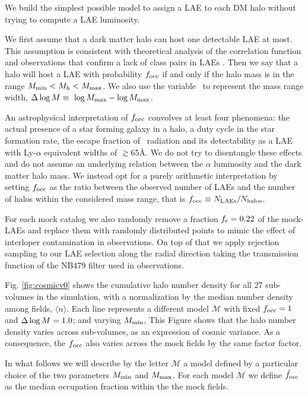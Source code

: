\documentclass{emulateapj}
\newcommand{\ly}{{\ifmmode{{\rm Ly}\alpha}\else{Ly$\alpha$}\fi}}
\newcommand{\mmin}{{\ifmmode{{M_{\rm min}}}\else{${M_{\rm min}}$}\fi}}
\newcommand{\mmax}{{\ifmmode{{M_{\rm max}}}\else{${M_{\rm max}}$}\fi}}
\newcommand{\dlm}{{\ifmmode{{\Delta \log M}}\else{$\Delta \log M$}\fi}}
\newcommand{\focc}{{\ifmmode{{f_{\rm occ}}}\else{${f_{\rm occ}}$}\fi}}
\begin{document}
We build the simplest possible model to assign a LAE to each DM halo
without trying to compute a LAE luminosity.
  
We first assume that a dark matter halo can host one detectable LAE at
most.   
This assumption is consistent with theoretical analysis of the
correlation function \citep{Jose2013b} and observations that confirm a
lack of  class pairs in LAEs \citep{Bond2009}.  
Then we say that a halo will host a LAE with probability $\focc$
if and only if the halo mass is in the range $\mmin < M_{\mathrm
  h} < \mmax$. 
We also use the variable \dlm\ to represent the mass range width,
$\dlm\equiv\ \log \mmax - \log \mmax$.  


An astrophysical interpretation of $f_{\rm occ}$ convolves at least
four phenomena: the actual presence of a star forming galaxy in a
halo, a duty cycle in the star formation rate, the escape fraction of
\ly\ radiation and its detectability as a LAE with Ly-$\alpha$ equivalent widths of $\gtrsim$65\AA.   
We do not try to disentangle these effects and do not assume an underlying relation between the
$\alpha$ luminosity and the dark matter halo mass.
We instead opt for a purely arithmetic interpretation by setting
$\focc$ as the ratio between the observed number of LAEs and the
number of halos within the considered mass range, that is $\focc \equiv N_{\rm
  LAEs}/N_{\mathrm{halos}}$.   

For each mock catalog we also randomly remove a fraction $f_{\rm c}=0.22$  of the mock-LAEs and replace 
them with randomly distributed points to mimic the effect of interloper
contamination   in \citet{Bielby16} observations. 
On top of that we apply rejection sampling  to our LAE selection 
along the radial direction taking the transmission function of the
NB479 filter used in \citet{Bielby16} observations. 



Fig. \ref{fig:cosmicv0}  shows the cumulative halo number density
for all 27 sub-volumes in the simulation, with a normalization by the
median number density among fields, $\langle n \rangle$. 
Each line represents a different model $\mathcal{M}$ with fixed
$\focc=1$ and $\dlm=1.0$; and varying $\mmin$, 
This Figure shows that the halo number  density varies across
sub-volumes, as an expression of cosmic variance. 
As a consequence, the $\focc$ also varies across the mock fields  
by the same factor factor. 



In what follows we will describe by the letter ${\mathcal M}$  a model
defined by a particular choice of the two parameters $M_{\rm min}$ and
$M_{\rm  max}$. For each model  ${\mathcal M}$ we define
$\tilde{f}_{\rm occ}$ as the median occupation fraction within the the
mock fields.
\end{document}
